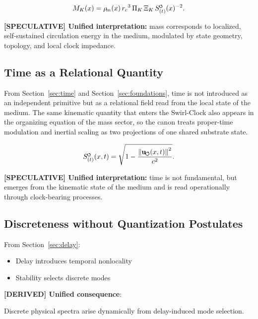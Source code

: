 \documentclass[11pt]{article}
\theoremstyle{definition}
\theoremstyle{plain}
\theoremstyle{remark}
\newcommand{\swirlarrow}{\mathchoice{\mkern-2mu\scriptstyle\boldsymbol{\circlearrowleft}}{\mkern-2mu\scriptstyle\boldsymbol{\circlearrowleft}}{\mkern-2mu\scriptscriptstyle\boldsymbol{\circlearrowleft}}{\mkern-2mu\scriptscriptstyle\boldsymbol{\circlearrowleft}}}
\newcommand{\rhoM}{\rho_{\!m}}
\newcommand{\SwirlClock}{{S_{(t)}^{\swirlarrow}}}
\newcommand{\rc}{{r_c}}
\newcommand{\uswirl}{\mathbf{u}_{\!\boldsymbol{\circlearrowleft}}}
\begin{document}
        \begin{align}
            M_K(x)=\rhoM(x)\,\rc^3\,\Pi_K\,\Xi_K\,\SwirlClock(x)^{-2}.
        \end{align}
        
        \textbf{[SPECULATIVE] Unified interpretation:} mass corresponds to localized, self-sustained circulation energy in the medium, modulated by state geometry, topology, and local clock impedance.
    
    \subsection{Time as a Relational Quantity}
        
        From Section~\ref{sec:time} and Section~\ref{sec:foundations}, time is not introduced as an independent primitive but as a relational field read from the local state of the medium. The same kinematic quantity that enters the Swirl-Clock also appears in the organizing equation of the mass sector, so the canon treats proper-time modulation and inertial scaling as two projections of one shared substrate state.
        
        \begin{align}
            \SwirlClock(x,t)=\sqrt{1-\frac{\norm{\uswirl(x,t)}^2}{c^2}}.
        \end{align}
        
        \textbf{[SPECULATIVE] Unified interpretation:} time is not fundamental, but emerges from the kinematic state of the medium and is read operationally through clock-bearing processes.
    
    \subsection{Discreteness without Quantization Postulates}
        
        From Section~\ref{sec:delay}:
        
        \begin{itemize}
            \item Delay introduces temporal nonlocality
            \item Stability selects discrete modes
        \end{itemize}
        
        \textbf{[DERIVED] Unified consequence}:
        \begin{center}
            Discrete physical spectra arise dynamically from delay-induced mode selection.
        \end{center}
        
\end{document}
